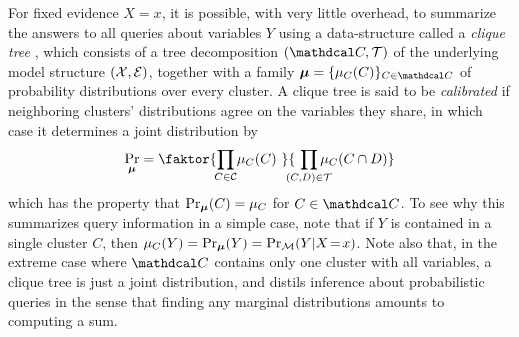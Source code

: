 \documentclass[twoside]{article}
\begin{document}
For fixed evidence
$X \!=\! x$, it is possible, with very
little overhead, to summarize the answers to all queries about variables
$Y$ using a data-structure called a \emph{clique tree}
\parencite[\S10]{koller2009probabilistic}, which consists of
a tree decomposition $(\mathdcal C, \mathcal T)$
of the underlying model structure $(\cal X, E)$, together with a family $\bmu = \{\mu_C(C)\}_{ C \in \mathdcal C}$ of probability distributions over every cluster.
A clique tree is said to be \emph{calibrated} if neighboring clusters' distributions agree on the variables they share,%
in which case it determines a joint distribution by
\begin{equation}
    \Pr_{\bmu} = \faktor
        {\prod_{\mathclap{C \in \cal C}} \mu_C(C)~}
        {~\prod_{\mathclap{(C,D) \in \cal T}} \mu_{C}(C \cap D)}
    \label{eq:cliquedist}
\end{equation}
which has the property that $\Pr_{\boldsymbol\mu}(C) = \mu_C$ for $C \in \mathdcal C$.
To see why this summarizes query information in a simple case, note that if $Y$ is contained in a single cluster $C$, then $\mu_C(Y) = \Pr_{\boldsymbol\mu}(Y) = \Pr_{\cal M}(Y | X \!=\! x)$.
Note also that, in the extreme case where $\mathdcal C$ contains only one cluster with all variables, a clique tree is just a joint distribution, and distils inference about probabilistic queries in the sense that finding any marginal distributions amounts to computing a sum.
\end{document}
